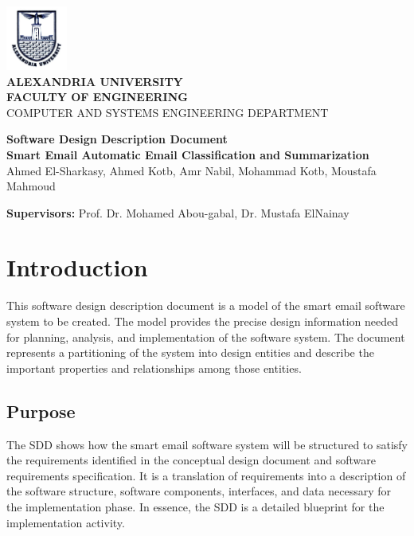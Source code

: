 \documentclass[12pt]{article}
\begin{document}
\begin{titlepage}
\vspace{-1.5cm}
\begin{center}
\includegraphics[width=2cm]{Logo_Alexandria_University.jpg}\\
\vspace{1cm}
\textbf{\large ALEXANDRIA UNIVERSITY} \\
\textbf{FACULTY OF ENGINEERING} \\
{\small  COMPUTER AND SYSTEMS ENGINEERING DEPARTMENT}

\vspace{2.5cm}
\textbf{\LARGE Software Design Description Document}\\
\textbf{\small Smart Email Automatic Email Classification and Summarization}\\
\vspace{1cm}
{ Ahmed El-Sharkasy, Ahmed Kotb, Amr Nabil, Mohammad Kotb, Moustafa Mahmoud }
\end{center}

\vspace{1ex}
\textbf{Supervisors:} Prof. Dr. Mohamed Abou-gabal, Dr. Mustafa ElNainay
\end{titlepage}

\newpage
\tableofcontents
\newpage

\section{Introduction}

This software design description document is a model of the smart email software system to be created. The model provides the precise design information needed for planning, analysis, and implementation of the software system. The document represents a partitioning of the system into design entities and describe the important properties and relationships among those entities.

\subsection{Purpose}
The SDD shows how the smart email software system will be structured to satisfy the requirements identiﬁed in the conceptual design document and software requirements speciﬁcation. It is a translation of requirements into a description of the software
structure, software components, interfaces, and data necessary for the implementation phase. In essence, the SDD is a detailed blueprint for the implementation activity.
\end{document}
